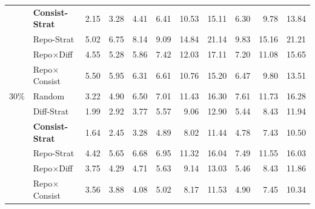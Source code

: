 \begin{table}[t]
\begin{tabular}{llrrrrrrrrr}
 & \textbf{Consist-Strat} & 2.15 & 3.28 & 4.41 & 6.41 & 10.53 & 15.11 & 6.30 & 9.78 & 13.84 \\
 & Repo-Strat & 5.02 & 6.75 & 8.14 & 9.09 & 14.84 & 21.14 & 9.83 & 15.16 & 21.21 \\
 & Repo$\times$Diff & 4.55 & 5.28 & 5.86 & 7.42 & 12.03 & 17.11 & 7.20 & 11.08 & 15.65 \\
 & Repo$\times$Consist & 5.50 & 5.95 & 6.31 & 6.61 & 10.76 & 15.20 & 6.47 & 9.80 & 13.51 \\
\midrule
30\% & Random & 3.22 & 4.90 & 6.50 & 7.01 & 11.43 & 16.30 & 7.61 & 11.73 & 16.28 \\
 & Diff-Strat & 1.99 & 2.92 & 3.77 & 5.57 & 9.06 & 12.90 & 5.44 & 8.43 & 11.94 \\
 & \textbf{Consist-Strat} & 1.64 & 2.45 & 3.28 & 4.89 & 8.02 & 11.44 & 4.78 & 7.43 & 10.50 \\
 & Repo-Strat & 4.42 & 5.65 & 6.68 & 6.95 & 11.32 & 16.04 & 7.49 & 11.55 & 16.03 \\
 & Repo$\times$Diff & 3.75 & 4.29 & 4.71 & 5.63 & 9.14 & 13.03 & 5.46 & 8.43 & 11.86 \\
 & Repo$\times$Consist & 3.56 & 3.88 & 4.08 & 5.02 & 8.17 & 11.53 & 4.90 & 7.45 & 10.34 \\
\bottomrule
\end{tabular}
\end{table}
